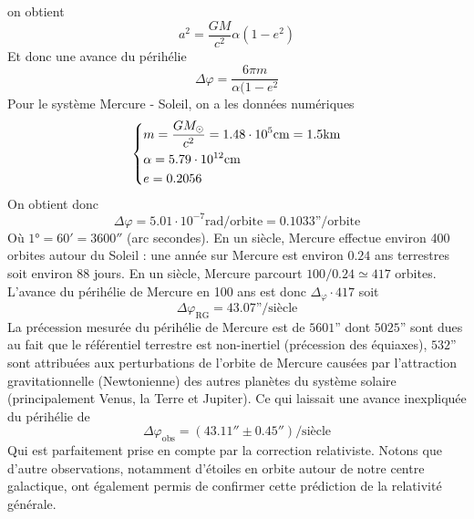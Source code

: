 on obtient
\begin{equation}
    a^2 = \frac{GM}{c^2} \alpha (1-e^2)
\end{equation}
Et donc une avance du périhélie
\begin{equation}
    \boxed{\Delta \varphi = \frac{6\pi m}{\alpha (1- e^2}}
\end{equation}
Pour le système Mercure - Soleil, on a les données numériques
\begin{equation}
    \begin{dcases}
        m = \frac{GM_\odot}{c^2} = 1.48 \cdot 10^5\text{cm} = 1.5\text{km}\\
        \alpha = 5.79 \cdot 10^{12}\text{cm} \\
        e = 0.2056
    \end{dcases}
\end{equation}
On obtient donc 
\begin{equation}
    \Delta \varphi = 5.01 \cdot 10^{-7}\text{rad/orbite} = 0.1033\text{''/orbite}
\end{equation}
Où $1° = 60' = 3600''$ (arc secondes). En un siècle, Mercure effectue environ 400 orbites autour du Soleil : une année sur Mercure est environ $0.24$ ans terrestres soit environ $88$ jours. En un siècle, Mercure parcourt $100/0.24 \simeq 417$ orbites. L'avance du périhélie de Mercure en 100 ans est donc $\Delta_\varphi \cdot 417$ soit
\begin{equation}
    \boxed{\Delta \varphi_\text{RG} = 43.07\text{''/siècle}}
\end{equation}
La précession mesurée du périhélie de Mercure est de $5601$'' dont $5025$'' sont dues au fait que le référentiel terrestre est non-inertiel (précession des équiaxes), $532$'' sont attribuées aux perturbations de l'orbite de Mercure causées par l'attraction gravitationnelle (Newtonienne) des autres planètes du système solaire (principalement Venus, la Terre et Jupiter). Ce qui laissait une avance inexpliquée du périhélie de
\begin{equation}
    \Delta \varphi_\text{obs} = (43.11'' \pm 0.45'')\text{/siècle}
\end{equation}
Qui est parfaitement prise en compte par la correction relativiste. Notons que d'autre observations, notamment d'étoiles en orbite autour de notre centre galactique, ont également permis de confirmer cette prédiction de la relativité générale.





